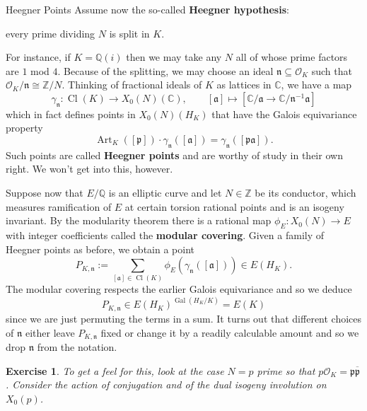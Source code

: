 \documentclass[aspectratio=1610]{beamer}
\renewcommand{\O}{\mathcal{O}}
\renewcommand{\subset}{\subseteq}
\newcommand{\C}{\mathbb{C}}
\newcommand{\Q}{\mathbb{Q}}
\newcommand{\Z}{\mathbb{Z}}
\newcommand{\iso}{\cong}
\newcommand{\mf}{\mathfrak}
\newcommand{\ov}{\overline}
\DeclareMathOperator{\Art}{Art}
\DeclareMathOperator{\Cl}{Cl}
\DeclareMathOperator{\Gal}{Gal}
\newtheorem{exercise}{Exercise}
\begin{document}
\begin{frame}{Heegner Points}
Assume now the so-called \textbf{Heegner hypothesis}: 
\begin{center}
every prime dividing $N$ is split in $K$.
\end{center} 
For instance, if $K=\Q(i)$ then we may take any $N$ all of whose prime factors are $1$ mod $4$. Because of the splitting, we may choose an ideal $\mf{n}\subset\O_K$ such that $\O_K/\mf{n}\iso\Z/N$. Thinking of fractional ideals of $K$ as lattices in $\C$, we have a map
$$\gamma_{\mf{n}}: \Cl(K)\to X_0(N)(\C),\qquad[\mf{a}]\mapsto[\C/\mf{a}\to\C/\mf{n}^{-1}\mf{a}]$$
which in fact defines points in $X_0(N)(H_K)$ that have the Galois equivariance property
$$\Art_K([\mf{p}])\cdot\gamma_{\mf{n}}([\mf{a}])=\gamma_{\mf{n}}([\mf{p}\mf{a}]).$$
Such points are called \textbf{Heegner points} and are worthy of study in their own right. We won't get into this, however.
\end{frame}

\begin{frame}
Suppose now that $E/\Q$ is an elliptic curve and let $N\in\Z$ be its conductor, which measures ramification of $E$ at certain torsion rational points and is an isogeny invariant. By the modularity theorem there is a rational map $\phi_E: X_0(N)\to E$ with integer coefficients called the \textbf{modular covering}. Given a family of Heegner points as before, we obtain a point 
$$P_{K,\mf{n}}:=\sum_{[\mf{a}]\in\Cl(K)}\phi_E(\gamma_{\mf{n}}([\mf{a}]))\in E(H_K).$$
The modular covering respects the earlier Galois equivariance and so we deduce 
$$P_{K,\mf{n}}\in E(H_K)^{\Gal(H_K/K)}=E(K)$$ 
since we are just permuting the terms in a sum. It turns out that different choices of $\mf{n}$ either leave $P_{K,\mf{n}}$ fixed or change it by a readily calculable amount and so we drop $\mf{n}$ from the notation. 
\begin{exercise}
To get a feel for this, look at the case $N=p$ prime so that $p\O_K=\mf{p}\ov{\mf{p}}$. Consider the action of conjugation and of the dual isogeny involution on $X_0(p)$.
\end{exercise}
\end{frame}
\end{document}
